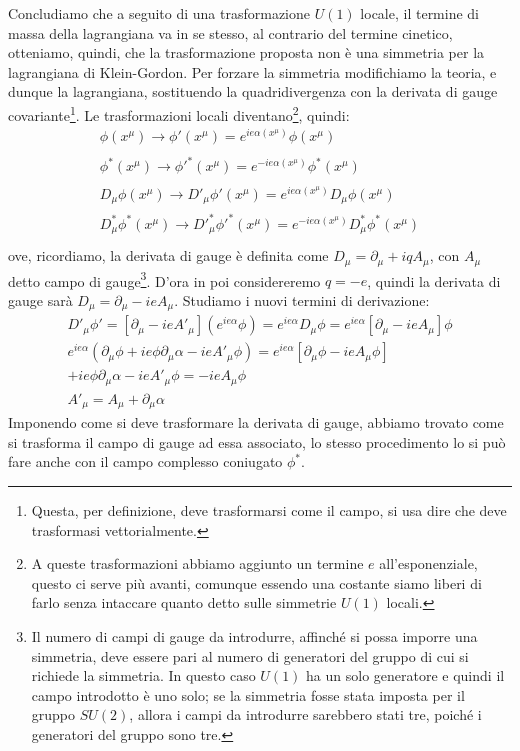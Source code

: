 Concludiamo che a seguito di una trasformazione $U(1)$ locale, il termine di massa della lagrangiana va in se stesso, al contrario del termine cinetico, otteniamo, quindi, che la trasformazione proposta non è una simmetria per la lagrangiana di Klein-Gordon. Per forzare la simmetria modifichiamo la teoria, e dunque la lagrangiana, sostituendo la quadridivergenza con la derivata di gauge covariante\footnote{Questa, per definizione, deve trasformarsi come il campo, si usa dire che deve trasformasi vettorialmente.}. Le trasformazioni locali diventano\footnote{A queste trasformazioni abbiamo aggiunto un termine $e$ all'esponenziale, questo ci serve più avanti, comunque essendo una costante siamo liberi di farlo senza intaccare quanto detto sulle simmetrie $U(1)$ locali.}, quindi:
\begin{equation}
\begin{gathered}
    \phi(x^\mu)\xrightarrow[\text{}]{\text{}} \phi'(x^\mu)=e^{ie\alpha(x^\mu)}\phi(x^\mu)\\
    \phi^*(x^\mu)\xrightarrow[\text{}]{\text{}}\phi'^*(x^\mu)=e^{-ie\alpha(x^\mu)}\phi^*(x^\mu)\\
    D_\mu \phi(x^\mu)\xrightarrow[\text{}]{\text{}}D'_\mu \phi'(x^\mu)=e^{ie\alpha(x^\mu)}D_\mu\phi(x^\mu)\\
   D^*_\mu \phi^*(x^\mu)\xrightarrow[\text{}]{\text{}} D'^*_\mu \phi'^*(x^\mu)=e^{-ie\alpha(x^\mu)}D^*_\mu\phi^*(x^\mu)\\
\end{gathered}
\end{equation}
ove, ricordiamo, la derivata di gauge è definita come $D_\mu=\partial_\mu+iqA_\mu$, con $A_\mu$ detto campo di gauge\footnote{Il numero di campi di gauge da introdurre, affinché si possa imporre una simmetria, deve essere pari al numero di generatori del gruppo di cui si richiede la simmetria. In questo caso $U(1)$ ha un solo generatore e quindi il campo introdotto è uno solo; se la simmetria fosse stata imposta per il gruppo $SU(2)$, allora i campi da introdurre sarebbero stati tre, poiché i generatori del gruppo sono tre.}. D'ora in poi considereremo $q=-e$, quindi la derivata di gauge sarà $D_\mu=\partial_\mu-ieA_\mu$. Studiamo i nuovi termini di derivazione:
\begin{equation}
\begin{gathered}
    D'_\mu \phi'=[\partial_\mu-ieA'_\mu](e^{ie\alpha}\phi)=e^{ie\alpha}D_\mu\phi=e^{ie\alpha}[\partial_\mu-ieA_\mu]\phi\\
  e^{ie\alpha}(\partial_\mu\phi+ie\phi\partial_\mu\alpha-ieA'_\mu\phi)=e^{ie\alpha}[\partial_\mu\phi-ieA_\mu\phi]\\
  +ie\phi\partial_\mu\alpha-ieA'_\mu\phi=-ieA_\mu\phi\\
  A'_\mu=A_\mu+\partial_\mu\alpha
\end{gathered}
\end{equation}
Imponendo come si deve trasformare la derivata di gauge, abbiamo trovato come si trasforma il campo di gauge ad essa associato, lo stesso procedimento lo si può fare anche con il campo complesso coniugato $\phi^*$.

